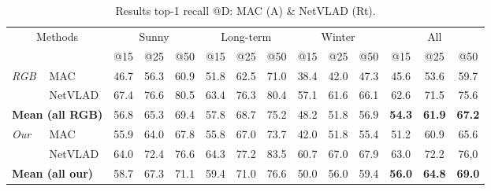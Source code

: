 {
\setlength{\tabcolsep}{1.3pt}
\renewcommand{\arraystretch}{1.2}
\begin{table}
	\caption{\label{tab/sum_res} Results top-1 recall @D: MAC (A) \& NetVLAD (Rt).}
	\scriptsize \center
	\begin{tabular}{l l | c c c | c c c | c c c | c c c}
	\multicolumn{2}{c|}{\multirow{2}{0.8cm}{Methods}} & \multicolumn{3}{c|}{Sunny} & \multicolumn{3}{c|}{Long-term} & \multicolumn{3}{c|}{Winter} & \multicolumn{3}{c}{All} \\
	 	&	  & @15   & @25   & @50   & @15   & @25  & @50   & @15   & @25   & @50   & @15 & @25 & @50 \\
	\hline
	\multirow{2}{0.5cm}{\textit{RGB}} & MAC  & 46.7 & 56.3 & 60.9 & 51.8 & 62.5 & 71.0 & 38.4 & 42.0 & 47.3 & 45.6 & 53.6 & 59.7 \\
									 & NetVLAD   & 67.4 & 76.6 & 80.5 & 63.4 & 76.3 & 80.4 & 57.1 & 61.6 & 66.1 & 62.6 & 71.5 & 75.6 \\
	\multicolumn{2}{l|}{\textbf{Mean (all RGB)}} & 56.8 & 65.3 & 69.4 & 57.8 & 68.7 & 75.2 & 48.2 & 51.8 & 56.9 & \textbf{54.3} & \textbf{61.9} & \textbf{67.2} \\
	\hline
	\multirow{2}{0.5cm}{\textit{Our}} &		MAC  & 55.9 & 64.0 &	67.8 & 55.8 & 67.0 & 73.7 &	42.0 & 51.8 & 55.4 & 51.2 & 60.9 & 65.6 \\
									& 	NetVLAD & 64.0 & 72.4 &	76.6 & 64.3 & 77.2 & 83.5 & 60.7 & 67.0 & 67.9 & 63.0 & 72.2 & 76,0 \\	
	\multicolumn{2}{l|}{\textbf{Mean (all our)}} 	& 58.7 & 67.3 & 71.1 & 59.4 & 71.0 & 76.6 & 50.0 & 56.0 & 59.4 & \textbf{56.0} & \textbf{64.8} & \textbf{69.0} \\	
	\hline
	\end{tabular}
	\vspace{-0.25cm}
\end{table}
}